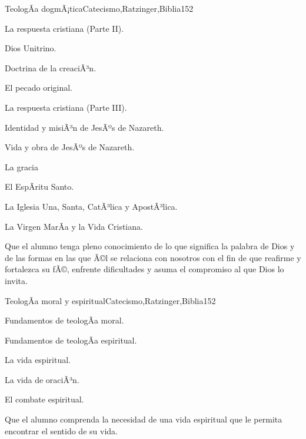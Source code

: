 \begin{syllabus}
\begin{unit}{TeologÃ­a dogmÃ¡tica}{Catecismo,Ratzinger,Biblia}{15}{2}
\begin{topics}
	\item La respuesta cristiana (Parte II). 
	      \begin{inparaenum}
		  \item Dios Unitrino.
		  \item Doctrina de la creaciÃ³n.
		  \item El pecado original.
	      \end{inparaenum}
	 \item La respuesta cristiana (Parte III). 
	      \begin{inparaenum}
		  \item Identidad y misiÃ³n de JesÃºs de Nazareth.
		  \item Vida y obra de JesÃºs de Nazareth.
		  \item La gracia
		  \item El EspÃ­ritu Santo.
		  \item La Iglesia Una, Santa, CatÃ³lica y ApostÃ³lica.
		  \item La Virgen MarÃ­a y la Vida Cristiana.
	      \end{inparaenum}
\end{topics}
\begin{unitgoals}
	\item Que el alumno tenga pleno conocimiento de lo que significa la palabra de Dios y de las formas en las que Ã©l se relaciona con nosotros con el fin de que reafirme y fortalezca su fÃ©, enfrente dificultades y asuma el compromiso al que Dios lo invita.
\end{unitgoals}
\end{unit}

\begin{unit}{TeologÃ­a moral y espiritual}{Catecismo,Ratzinger,Biblia}{15}{2}
\begin{topics}
      \item Fundamentos de teologÃ­a moral.
      \item Fundamentos de teologÃ­a espiritual.
      \item La vida espiritual.
      \item La vida de oraciÃ³n.
      \item El combate espiritual.
\end{topics}

\begin{unitgoals}
      \item Que el alumno comprenda la necesidad de una vida espiritual que le permita encontrar el sentido de su vida.
\end{unitgoals}
\end{unit}



\begin{coursebibliography}
\end{coursebibliography}

\end{syllabus}
